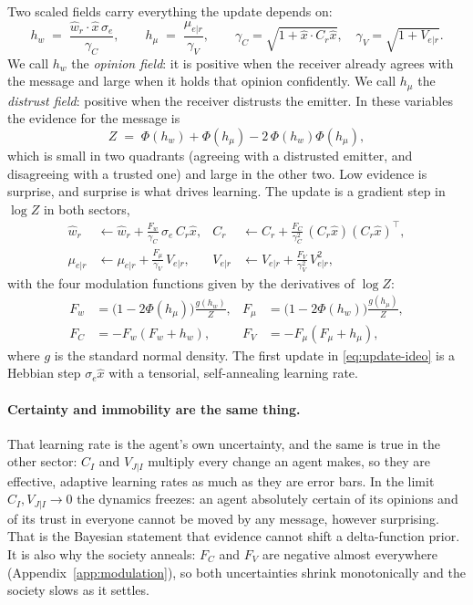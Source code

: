\documentclass{article}
\newcommand{\hw}{h_{w}}
\newcommand{\hmu}{h_{\mu}}
\newcommand{\Fw}{F_{w}}
\newcommand{\Fmu}{F_{\mu}}
\newcommand{\FC}{F_{C}}
\newcommand{\FV}{F_{V}}
\begin{document}
Two scaled fields carry everything the update depends on:
%
\begin{equation}
  \hw \;=\; \frac{\hat{w}_r\cdot\hat{x}\,\sigma_e}{\gamma_C},
  \qquad
  \hmu \;=\; \frac{\mu_{e|r}}{\gamma_V},
  \qquad
  \gamma_C=\sqrt{1+\hat{x}\cdot C_r\hat{x}},\quad \gamma_V=\sqrt{1+V_{e|r}} .
  \label{eq:fields}
\end{equation}
%
We call $\hw$ the \emph{opinion field}: it is positive when the receiver already
agrees with the message and large when it holds that opinion confidently. We call
$\hmu$ the \emph{distrust field}: positive when the receiver distrusts the emitter.
In these variables the evidence for the message is
%
\begin{equation}
  Z \;=\; \Phi(\hw) + \Phi(\hmu) - 2\,\Phi(\hw)\Phi(\hmu),
  \label{eq:evidence}
\end{equation}
%
which is small in two quadrants (agreeing with a distrusted emitter, and disagreeing with a
trusted one) and large in the other two. Low evidence is
surprise, and surprise is what drives learning. The update is a gradient step in
$\log Z$ in both sectors,
%
\begin{align}
  \hat{w}_r &\leftarrow \hat{w}_r + \frac{\Fw}{\gamma_C}\,\sigma_e\,C_r\hat{x},
  &
  C_r &\leftarrow C_r + \frac{\FC}{\gamma_C^{2}}\,(C_r\hat{x})(C_r\hat{x})^{\!\top},
  \label{eq:update-ideo}\\
  \mu_{e|r} &\leftarrow \mu_{e|r} + \frac{\Fmu}{\gamma_V}\,V_{e|r},
  &
  V_{e|r} &\leftarrow V_{e|r} + \frac{\FV}{\gamma_V^{2}}\,V_{e|r}^{2},
  \label{eq:update-aff}
\end{align}
%
with the four modulation functions given by the derivatives of $\log Z$:
%
\begin{align}
  \Fw &= \bigl(1-2\Phi(\hmu)\bigr)\frac{g(\hw)}{Z},
  &\Fmu &= \bigl(1-2\Phi(\hw)\bigr)\frac{g(\hmu)}{Z},
  \nonumber\\
  \FC &= -\Fw(\Fw+\hw),
  &\FV &= -\Fmu(\Fmu+\hmu),
  \label{eq:modulation}
\end{align}
%
where $g$ is the standard normal density. The first update in
\eqref{eq:update-ideo} is a Hebbian step $\sigma_e\hat{x}$ with a tensorial,
self-annealing learning rate.

\paragraph{Certainty and immobility are the same thing.} That learning rate is the
agent's own uncertainty, and the same is true in the other sector: $C_I$ and
$V_{J|I}$ multiply every change an agent makes, so they are effective, adaptive
learning rates as much as they are error bars. In the limit $C_I, V_{J|I}\to0$ the dynamics freezes:
an agent absolutely certain of its opinions and of its trust in
everyone cannot be moved by any message, however surprising. That is the Bayesian
statement that evidence cannot shift a delta-function prior. It is also why the
society anneals: $\FC$ and $\FV$ are negative almost everywhere
(Appendix~\ref{app:modulation}), so both uncertainties shrink monotonically and the
society slows as it settles.
\end{document}
